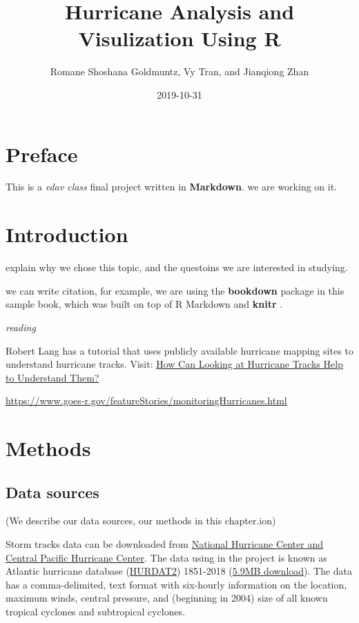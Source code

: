 \documentclass[]{book}
\title{Hurricane Analysis and Visulization Using R}
\author{Romane Shoshana Goldmuntz, Vy Tran, and Jianqiong Zhan}
\date{2019-10-31}
\begin{document}
\maketitle

{
\setcounter{tocdepth}{1}
\tableofcontents
}
\hypertarget{preface}{%
\chapter{Preface}\label{preface}}

This is a \emph{edav class} final project written in \textbf{Markdown}. we are working on it.

\hypertarget{intro}{%
\chapter{Introduction}\label{intro}}

explain why we chose this topic, and the questoins we are interested in studying.

we can write citation, for example, we are using the \textbf{bookdown} package \citep{R-bookdown} in this sample book, which was built on top of R Markdown and \textbf{knitr} \citep{xie2015}.

\emph{reading}

Robert Lang has a tutorial that uses publicly available hurricane mapping sites to understand hurricane tracks. Visit: \href{\%22https://www.gislounge.com/how-can-looking-at-hurricane-tracks-help-to-understand-them/\%22}{How Can Looking at Hurricane Tracks Help to Understand Them?}

\url{https://www.goes-r.gov/featureStories/monitoringHurricanes.html}

\hypertarget{methods}{%
\chapter{Methods}\label{methods}}

\hypertarget{data-sources}{%
\section{Data sources}\label{data-sources}}

(We describe our data sources, our methods in this chapter.ion)

Storm tracks data can be downloaded from \href{\%22https://www.nhc.noaa.gov/data/\#hurdat\%22}{National Hurricane Center and Central Pacific Hurricane Center}. The data using in the project is known as Atlantic hurricane database (\href{\%22https://www.nhc.noaa.gov/data/hurdat/hurdat2-format-atlantic.pdf\%22}{HURDAT2}) 1851-2018 (\href{\%22https://www.nhc.noaa.gov/data/hurdat/hurdat2-1851-2018-051019.txt\%22}{5.9MB download}). The data has a comma-delimited, text format with six-hourly information on the location, maximum winds, central pressure, and (beginning in 2004) size of all known tropical cyclones and subtropical cyclones.
\end{document}
